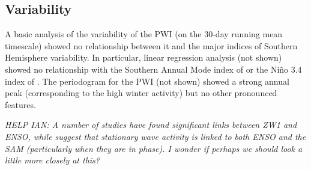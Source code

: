 \subsection{Variability}

A basic analysis of the variability of the PWI (on the 30-day running mean timescale) showed no relationship between it and the major indices of Southern Hemisphere variability. In particular, linear regression analysis (not shown) showed no relationship with the Southern Annual Mode index of \citet{Marshall2003} or the Ni\~{n}o 3.4 index of \citet{Trenberth2001}. The periodogram for the PWI (not shown) showed a strong annual peak (corresponding to the high winter activity) but no other pronounced features.

\textit{HELP IAN: A number of studies \citep[e.g.][]{Trenberth1980,Raphael2003,Hobbs2007} have found significant links between ZW1 and ENSO, while \citet{Pezza2012} suggest that stationary wave activity is linked to both ENSO and the SAM (particularly when they are in phase). I wonder if perhaps we should look a little more closely at this?}